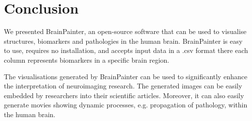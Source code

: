 \documentclass{llncs}
\begin{document}
\section{Conclusion}

We presented BrainPainter, an open-source software that can be used to visualise structures, biomarkers and pathologies in the human brain. BrainPainter is easy to use, requires no installation, and accepts input data in a .csv format there each column represents biomarkers in a specific brain region. 

The visualisations generated by BrainPainter can be used to significantly enhance the interpretation of neuroimaging research. The generated images can be easily embedded by researchers into their scientific articles. Moreover, it can also easily generate movies showing dynamic processes, e.g. propagation of pathology, within the human brain. 



% 
% 




\end{document}
